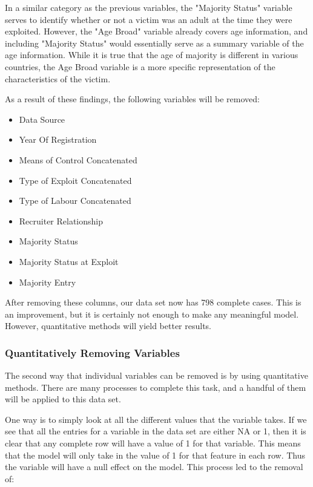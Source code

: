 \documentclass{article} %
\begin{document}
	In a similar category as the previous variables, the "Majority Status" variable serves to identify whether or not a victim was an adult at the time they were exploited. However, the "Age Broad" variable already covers age information, and including "Majority Status" would essentially serve as a summary variable of the age information. While it is true that the age of majority is different in various countries, the Age Broad variable is a more specific representation of the characteristics of the victim.
	
	As a result of these findings, the following variables will be removed:
	
	\begin{multicols}{2}
		\begin{itemize}
		\item Data Source
		\item Year Of Registration
		\item Means of Control Concatenated
		\item Type of Exploit Concatenated
		\item Type of Labour Concatenated
		\item Recruiter Relationship
		\item Majority Status
		\item Majority Status at Exploit
		\item Majority Entry
	\end{itemize}
	\end{multicols}
	
	After removing these columns, our data set now has 798 complete cases. This is an improvement, but it is certainly not enough to make any meaningful model. However, quantitative methods will yield better results.

	
	\subsubsection{Quantitatively Removing Variables} \label{QuantRemove}
	
	The second way that individual variables can be removed is by using quantitative methods. There are many processes to complete this task, and a handful of them will be applied to this data set. 
	
	One way is to simply look at all the different values that the variable takes. If we see that all the entries for a variable in the data set are either NA or 1, then it is clear that any complete row will have a value of 1 for that variable. This means that the model will only take in the value of 1 for that feature in each row. Thus the variable will have a null effect on the model. This process led to the removal of:
	
\end{document}
